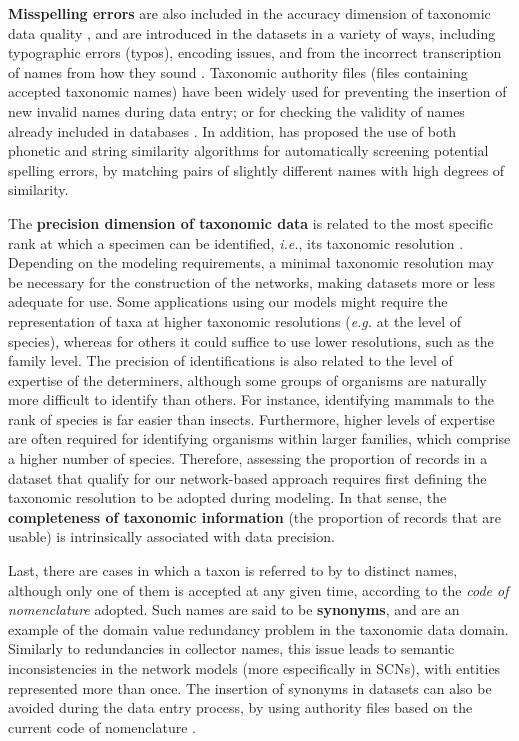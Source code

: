 \textbf{Misspelling errors} are also included in the accuracy dimension of taxonomic data quality \cite{Veiga2014}, and are introduced in the datasets in a variety of ways, including typographic errors (typos), encoding issues, and from the incorrect transcription of names from how they sound \cite{Dalcin2005}.
Taxonomic authority files (files containing accepted taxonomic names) have been widely used for preventing the insertion of new invalid names during data entry; or for checking the validity of names already included in databases \cite{Chapman2005a}.
In addition,   has proposed the use of both phonetic and string similarity algorithms for automatically screening potential spelling errors, by matching pairs of slightly different names with high degrees of similarity.

The \textbf{precision dimension of taxonomic data} is related to the most specific rank at which a specimen can be identified, \textit{i.e.}, its taxonomic resolution \cite{Veiga2014}.
Depending on the modeling requirements, a minimal taxonomic resolution may be necessary for the construction of the networks, making datasets more or less adequate for use.
Some applications using our models might require the representation of taxa at higher taxonomic resolutions  (\textit{e.g.} at the level of species), whereas for others it could suffice to use lower resolutions, such as the family level.
The precision of identifications is also related to the level of expertise of the determiners, although some groups of organisms are naturally more difficult to identify than others.
For instance, identifying mammals to the rank of species is far easier than insects.
Furthermore, higher levels of expertise are often required for identifying organisms within larger families, which comprise a higher number of species.
%
Therefore, assessing the proportion of records in a dataset that qualify for our network-based approach requires first defining the taxonomic resolution to be adopted during modeling.
In that sense, the \textbf{completeness of taxonomic information} (the proportion of records that are usable) is intrinsically associated with data precision.

Last, there are cases in which a taxon is referred to by to distinct names, although only one of them is accepted at any given time, according to the \textit{code of nomenclature} adopted.
Such names are said to be \textbf{synonyms}, and are an example of the domain value redundancy problem in the taxonomic data domain.
Similarly to redundancies in collector names, this issue leads to semantic inconsistencies in the network models (more especifically in SCNs), with entities represented more than once.
The insertion of synonyms in datasets can also be avoided during the data entry process, by using authority files based on the current code of nomenclature \cite{Veiga2014}. 













